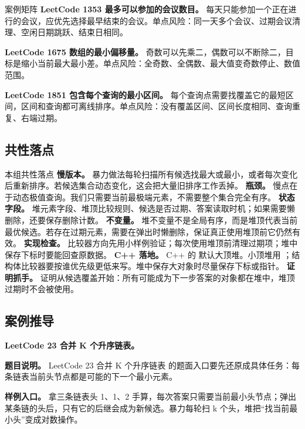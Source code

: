 \begin{principlebox}{案例矩阵}
\textbf{LeetCode 1353 最多可以参加的会议数目。}
每天只能参加一个正在进行的会议，应优先选择最早结束的会议。单点风险：同一天多个会议、过期会议清理、空闲日期跳跃、结束日相同。

\textbf{LeetCode 1675 数组的最小偏移量。}
奇数可以先乘二，偶数可以不断除二，目标是缩小当前最大最小差。单点风险：全奇数、全偶数、最大值变奇数停止、数值范围。

\textbf{LeetCode 1851 包含每个查询的最小区间。}
每个查询点需要找覆盖它的最短区间，区间和查询都可离线排序。单点风险：没有覆盖区间、区间长度相同、查询重复、右端过期。

\end{principlebox}

\subsection{共性落点}

\begin{principlebox}{本组共性落点}
\textbf{慢版本。} 暴力做法每轮扫描所有候选找最大或最小，或者每次变化后重新排序。若候选集合动态变化，这会把大量旧排序工作丢掉。
\textbf{瓶颈。} 慢点在于动态极值查询。我们只需要当前最极端元素，不需要整个集合完全有序。
\textbf{状态字段。} 堆元素字段、堆顶比较规则、候选是否过期、答案读取时机；如果需要懒删除，还要保存删除计数。
\textbf{不变量。} 堆不变量不是全局有序，而是堆顶代表当前最优候选。若存在过期元素，需要在弹出时懒删除，保证真正使用堆顶前它仍然有效。
\textbf{实现检查。} 比较器方向先用小样例验证；每次使用堆顶前清理过期项；堆中保存下标时要能回查原数据。
\textbf{C++ 落地。} C++ 的  默认大顶堆。小顶堆用 ；结构体比较器要按谁优先级更低来写。堆中保存大对象时尽量保存下标或指针。
\textbf{证明抓手。} 证明从候选覆盖开始：所有可能成为下一步答案的对象都在堆中，堆顶过期时不会被使用。
\end{principlebox}

\subsection{案例推导}

\noindent\textbf{LeetCode 23 合并 K 个升序链表。}

\textbf{题目说明。} LeetCode 23 合并 K 个升序链表 的题面入口要先还原成具体任务：每条链表当前头节点都是可能的下一个最小元素。

\textbf{样例入口。} 拿三条链表头 1、1、2 手算，每次答案只需要当前最小头节点；弹出某条链的头后，只有它的后继会成为新候选。暴力每轮扫 k 个头，堆把“找当前最小头”变成对数操作。

